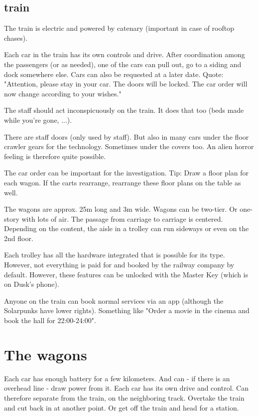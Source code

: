 \documentclass{book}
\begin{document}
\subsection{train}

The train is electric and powered by catenary (important in case of rooftop chases).

Each car in the train has its own controls and drive. After coordination among the passengers (or as needed), one of the cars can pull out, go to a siding and dock somewhere else. Cars can also be requested at a later date. Quote: "Attention, please stay in your car. The doors will be locked. The car order will now change according to your wishes."

The staff should act inconspicuously on the train. It does that too (beds made while you're gone, ...).

There are staff doors (only used by staff). But also in many cars under the floor crawler gears for the technology. Sometimes under the covers too. An alien horror feeling is therefore quite possible.

The car order can be important for the investigation. Tip: Draw a floor plan for each wagon. If the carts rearrange, rearrange these floor plans on the table as well.

The wagons are approx. 25m long and 3m wide. Wagons can be two-tier. Or one-story with lots of air.
The passage from carriage to carriage is centered. Depending on the content, the aisle in a trolley can run sideways or even on the 2nd floor.

Each trolley has all the hardware integrated that is possible for its type. However, not everything is paid for and booked by the railway company by default. However, these features can be unlocked with the Master Key (which is on Dusk's phone).

Anyone on the train can book normal services via an app (although the Solarpunks have lower rights).
Something like "Order a movie in the cinema and book the hall for 22:00-24:00".

\section{The wagons}

Each car has enough battery for a few kilometers. And can - if there is an overhead line - draw power from it. Each car has its own drive and control. Can therefore separate from the train, on the neighboring track. Overtake the train and cut back in at another point.
Or get off the train and head for a station.
\end{document}
